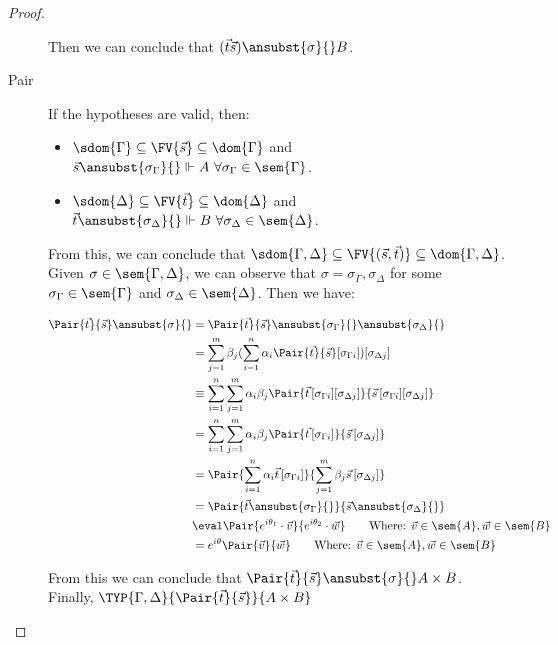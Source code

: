 \begin{proof}
\begin{description}
    Then we can conclude that $(\vec{t}\vec{s})\ansubst{\sigma}{}\real B$.
    
    \item[Pair] If the hypotheses are valid, then:

    \begin{itemize}
        \item $\sdom{\Gamma}\subseteq \FV{\vec s}\subseteq \dom{\Gamma}$ and $\vec s \ansubst{\sigma_\Gamma}{}\Vdash A\ \forall \sigma_\Gamma\in\sem{\Gamma}$.
        \item $\sdom{\Delta}\subseteq \FV{\vec t}\subseteq \dom{\Delta}$ and $\vec t\ansubst{\sigma_\Delta}{}\Vdash B\ \forall \sigma_\Delta\in\sem{\Delta}$.
    \end{itemize}
    
    From this, we can conclude that $\sdom{\Gamma,\Delta}\subseteq \FV{(\vec s, \vec t)}\subseteq \dom{\Gamma,\Delta}$. Given $\sigma\in\sem{\Gamma,\Delta}$, we can observe that $\sigma=\sigma_\Gamma,\sigma_\Delta$ for some  $\sigma_\Gamma\in\sem{\Gamma}$ and $\sigma_\Delta\in\sem{\Delta}$. Then we have:

    \begin{align*}
        \Pair{\vec{t}}{\vec{s}}\ansubst{\sigma}{} &= \Pair{\vec{t}}{\vec{s}}\ansubst{\sigma_\Gamma}{}\ansubst{\sigma_\Delta}{}\\
        &=\sum_{j=1}^{m} \beta_j (\sum_{i=1}^{n} \alpha_i \Pair{\vec{t}}{\vec{s}}[\sigma_{\Gamma i}])[\sigma_{\Delta j}]\\
        &\equiv\sum_{i=1}^{n}\sum_{j=1}^{m} \alpha_i \beta_j \Pair{\vec{t}\,[\sigma_{\Gamma i}][\sigma_{\Delta j}]}{\vec{s}\,[\sigma_{\Gamma i}][\sigma_{\Delta j}]}\\
        &=\sum_{i=1}^{n}\sum_{j=1}^{m} \alpha_i \beta_j \Pair{\vec{t}\,[\sigma_{\Gamma i}]}{\vec{s}\,[\sigma_{\Delta j}]}\\
        &=\Pair{\sum_{i=1}^{n} \alpha_i \vec{t}\, [\sigma_{\Gamma i}]}{\sum_{j=1}^{m} \beta_j \vec{s}\, [\sigma_{\Delta j}]}\\
        &=\Pair{\vec{t}\ansubst{\sigma_\Gamma}{}}{\vec{s}\ansubst{\sigma_\Delta}{}}\\
        &\eval \Pair{e^{i\theta_1}\cdot\vec v}{e^{i\theta_2}\cdot\vec w}\qquad\text{Where: }\vec{v}\in\sem{A}, \vec{w}\in\sem{B}\\
        &= e^{i\theta} \Pair{\vec{v}}{\vec{w}}\qquad\text{Where: }\vec{v}\in\sem{A},\vec{w}\in\sem{B}
    \end{align*}
    
    From this we can conclude that $\Pair{\vec t}{\vec{s}}\ansubst{\sigma}{}\real A\times B$. Finally, $\TYP{\Gamma,\Delta}{\Pair{\vec{t}}{\vec{s}}}{A\times B}$
    

\end{description}
\end{proof}
